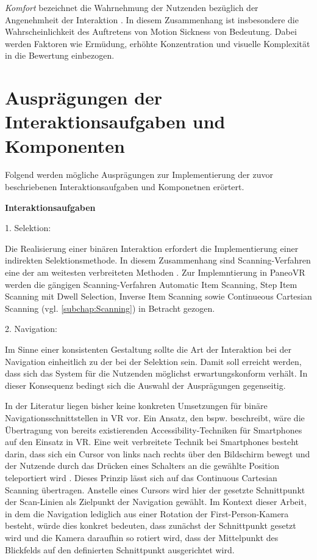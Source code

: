 \textit{Komfort} bezeichnet die Wahrnehmung der Nutzenden bezüglich der Angenehmheit der Interaktion \citep{jerald_vr_2016}. In diesem Zusammenhang ist insbesondere die Wahrscheinlichkeit des Auftretens von Motion Sickness von Bedeutung. Dabei werden Faktoren wie Ermüdung, erhöhte Konzentration und visuelle Komplexität in die Bewertung einbezogen.

\section{Ausprägungen der Interaktionsaufgaben und Komponenten}

Folgend werden mögliche Ausprägungen zur Implementierung der zuvor beschriebenen Interaktionsaufgaben und Komponetnen erörtert.

{\normalfont \bfseries Interaktionsaufgaben}  

1. Selektion: 

Die Realisierung einer binären Interaktion erfordert die Implementierung einer indirekten Selektionsmethode. In diesem Zusammenhang sind Scanning-Verfahren eine der am weitesten verbreiteten Methoden \citep{COOK2015117}. Zur Implemntierung in PaneoVR werden die gängigen Scanning-Verfahren Automatic Item Scanning, Step Item Scanning mit Dwell Selection, Inverse Item Scanning sowie Continueous Cartesian Scanning (vgl. \autoref{subchap:Scanning}) in Betracht gezogen. 

2. Navigation:

Im Sinne einer konsistenten Gestaltung sollte die Art der Interaktion bei der Navigation einheitlich zu der bei der Selektion sein. Damit soll erreicht werden, dass sich das System für die Nutzenden möglichst erwartungskonform verhält. In dieser Konsequenz bedingt sich die Auswahl der Ausprägungen gegenseitig.

In der Literatur liegen bisher keine konkreten Umsetzungen für binäre Navigationsschnittstellen in VR vor. Ein Ansatz, den bspw. \citet{wentzel_bring-your-own_2023} beschreibt, wäre die Übertragung von bereits existierenden Accessibility-Techniken für Smartphones auf den Einsatz in VR. Eine weit verbreitete Technik bei Smartphones besteht darin, dass sich ein Cursor von links nach rechts über den Bildschirm bewegt und der Nutzende durch das Drücken eines Schalters an die gewählte Position teleportiert wird \citep{wentzel_bring-your-own_2023}. Dieses Prinzip lässt sich auf das Continuous Cartesian Scanning übertragen. Anstelle eines Cursors wird hier der gesetzte Schnittpunkt der Scan-Linien als Zielpunkt der Navigation gewählt. Im Kontext dieser Arbeit, in dem die Navigation lediglich aus einer Rotation der First-Person-Kamera besteht, würde dies konkret bedeuten, dass zunächst der Schnittpunkt gesetzt wird und die Kamera daraufhin so rotiert wird, dass der Mittelpunkt des Blickfelds auf den definierten Schnittpunkt ausgerichtet wird. 

